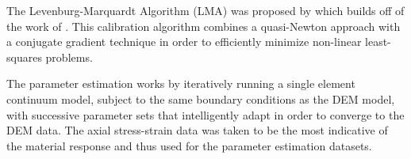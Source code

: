 The Levenburg-Marquardt Algorithm (LMA) was proposed by \citet{marquardt_algorithm_1963} which builds off of the work of \citet{levenberg_method_1944}. This calibration algorithm combines a quasi-Newton approach with a conjugate gradient technique in order to efficiently minimize non-linear least-squares problems. 


The parameter estimation works by iteratively running a single element continuum model, subject to the same boundary conditions as the DEM model, with successive parameter sets that intelligently adapt in order to converge to the DEM data. The axial stress-strain data was taken to be the most indicative of the material response and thus used for the parameter estimation datasets.


